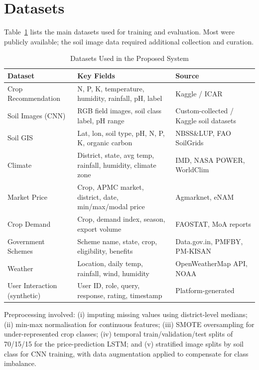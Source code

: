 \documentclass[conference]{IEEEtran}
\begin{document}
\section{Datasets}

Table~\ref{tab:datasets} lists the main datasets used for training and
evaluation. Most were publicly available; the soil image data required
additional collection and curation.

\begin{table}[htbp]
\caption{Datasets Used in the Proposed System}
\label{tab:datasets}
\renewcommand{\arraystretch}{1.25}
\begin{tabular}{p{2.1cm} p{2.8cm} p{2.3cm}}
\toprule
\textbf{Dataset} & \textbf{Key Fields} & \textbf{Source} \\
\midrule
Crop Recommendation
  & N, P, K, temperature, humidity, rainfall, pH, label
  & Kaggle / ICAR \\
Soil Images (CNN)
  & RGB field images, soil class label, pH range
  & Custom-collected / Kaggle soil datasets \\
Soil GIS
  & Lat, lon, soil type, pH, N, P, K, organic carbon
  & NBSS\&LUP, FAO SoilGrids \\
Climate
  & District, state, avg temp, rainfall, humidity, climate zone
  & IMD, NASA POWER, WorldClim \\
Market Price
  & Crop, APMC market, district, date, min/max/modal price
  & Agmarknet, eNAM \\
Crop Demand
  & Crop, demand index, season, export volume
  & FAOSTAT, MoA reports \\
Government Schemes
  & Scheme name, state, crop, eligibility, benefits
  & Data.gov.in, PMFBY, PM-KISAN \\
Weather
  & Location, daily temp, rainfall, wind, humidity
  & OpenWeatherMap API, NOAA \\
User Interaction (synthetic)
  & User ID, role, query, response, rating, timestamp
  & Platform-generated \\
\bottomrule
\end{tabular}
\end{table}

Preprocessing involved: (i) imputing missing values using district-level
medians; (ii) min-max normalisation for continuous features; (iii) SMOTE
oversampling for under-represented crop classes; (iv) temporal
train/validation/test splits of 70/15/15 for the price-prediction LSTM; and
(v) stratified image splits by soil class for CNN training, with data
augmentation applied to compensate for class imbalance.
\end{document}
